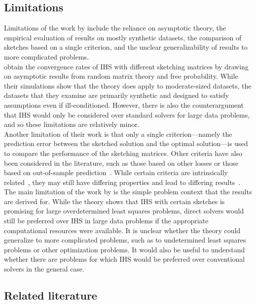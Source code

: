 \subsection{Limitations}

Limitations of the work by \citet{Lacotte:2020} include the reliance on asymptotic theory, the empirical evaluation of results on mostly synthetic datasets, the comparison of sketches based on a single criterion, and the unclear generalizability of results to more complicated problems.
\\

\citet{Lacotte:2020} obtain the convergence rates of IHS with different sketching matrices by drawing on asymptotic results from random matrix theory and free probability. While their simulations show that the theory does apply to moderate-sized datasets, the datasets that they examine are primarily synthetic and designed to satisfy assumptions even if ill-conditioned. However, there is also the counterargument that IHS would only be considered over standard solvers for large data problems, and so these limitations are relatively minor.
\\

Another limitation of their work is that only a single criterion---namely the prediction error between the sketched solution and the optimal solution---is used to compare the performance of the sketching matrices. Other criteria have also been considered in the literature, such as those based on other losses or those based on out-of-sample prediction~\citep{Dobriban:2019,Pilanci:2016}. While certain criteria are intrinsically related~\citep{Drineas:2011}, they may still have differing properties and lead to differing results~\citep{Dobriban:2019}.
\\

The main limitation of the work by \citet{Lacotte:2020} is the simple problem context that the results are derived for. While the theory shows that IHS with certain sketches is promising for large overdetermined least squares problems, direct solvers would still be preferred over IHS in large data problems if the appropriate computational resources were available. It is unclear whether the theory could generalize to more complicated problems, such as to undetermined least squares problems or other optimization problems. It would also be useful to understand whether there are problems for which IHS would be preferred over conventional solvers in the general case.


\subsection{Related literature}


